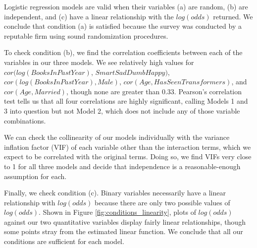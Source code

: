 \par Logistic regression models are valid when their variables (a) are random, (b) are independent, and (c) have a linear relationship with the $log(odds)$ returned. We conclude that condition (a) is satisfied because the survey was conducted by a reputable firm using sound randomization procedures.

\par \bigskip To check condition (b), we find the correlation coefficients between each of the variables in our three models. We see relatively high values for $cor(log(BooksInPastYear)$, $SmartSadDumbHappy)$, $cor(log(BooksInPastYear),Male)$, $cor(Age,HasSeenTransformers)$, and $cor(Age,Married)$, though none are greater than 0.33. Pearson's correlation test tells us that all four correlations are highly significant, calling Models 1 and 3 into question but not Model 2, which does not include any of those variable combinations.

\par \bigskip We can check the collinearity of our models individually with the variance inflation factor (VIF) of each variable other than the interaction terms, which we expect to be correlated with the original terms. Doing so, we find VIFs very close to 1 for all three models and decide that independence is a reasonable-enough assumption for each.

\par \bigskip Finally, we check condition (c). Binary variables necessarily have a linear relationship with $log(odds)$ because there are only two possible values of $log(odds)$. Shown in Figure \ref{fig:conditions_linearity}, plots of $log(odds)$ against our two quantitative variables display fairly linear relationships, though some points stray from the estimated linear function. We conclude that all our conditions are sufficient for each model.

